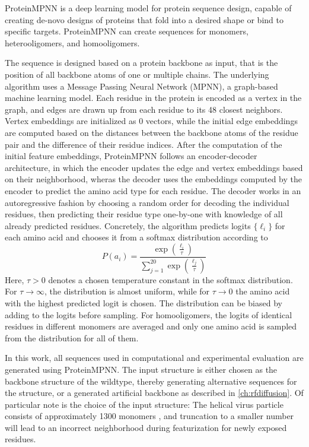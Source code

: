 ProteinMPNN \cite{PMPNN2022} is a deep learning model for protein sequence design, capable of creating de-novo designs of proteins that fold into a desired shape or bind to specific targets. ProteinMPNN can create sequences for monomers, heterooligomers, and homooligomers. 

The sequence is designed based on a protein backbone as input, that is the position of all backbone atoms of one or multiple chains. The underlying algorithm uses a Message Passing Neural Network (MPNN), a graph-based machine learning model. Each residue in the protein is encoded as a vertex in the graph, and edges are drawn up from each residue to its 48 closest neighbors. Vertex embeddings are initialized as 0 vectors, while the initial edge embeddings are computed based on the distances between the backbone atoms of the residue pair and the difference of their residue indices. After the computation of the initial feature embeddings, ProteinMPNN follows an encoder-decoder architecture, in which the encoder updates the edge and vertex embeddings based on their neighborhood, wheras the decoder uses the embeddings computed by the encoder to predict the amino acid type for each residue. The decoder works in an autoregressive fashion by choosing a random order for decoding the individual residues, then predicting their residue type one-by-one with knowledge of all already predicted residues. Concretely, the algorithm predicts logits $\{\ell_i\}$ for each amino acid and chooses it from a softmax distribution according to
$$P(a_i) = \frac{\exp\left( \frac{\ell_i}{\tau} \right)}{\sum_{j=1}^{20} \exp\left( \frac{\ell_j}{\tau} \right)}$$
Here, $\tau>0$ denotes a chosen temperature constant in the softmax distribution. For $\tau\rightarrow\infty$, the distribution is almost uniform, while for $\tau\rightarrow 0$ the amino acid with the highest predicted logit is chosen. The distribution can be biased by adding to the logits before sampling. For homooligomers, the logits of identical residues in different monomers are averaged and only one amino acid is sampled from the distribution for all of them. 

In this work, all sequences used in computational and experimental evaluation are generated using ProteinMPNN. The input structure is either chosen as the backbone structure of the wildtype, thereby generating alternative sequences for the structure, or a generated artificial backbone as described in \autoref{ch:rfdiffusion}. Of particular note is the choice of the input structure: The helical virus particle consists of approximately 1300 monomers \cite{Grinzato2020}, and truncation to a smaller number will lead to an incorrect neighborhood during featurization for newly exposed residues. 

